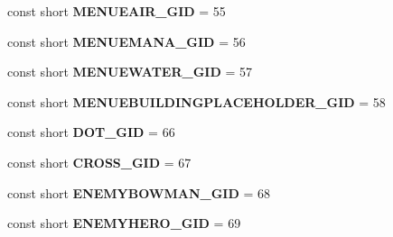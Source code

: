 \begin{DoxyCompactItemize}
\item 
\hypertarget{classClient_1_1Common_1_1Helper_1_1ClientConstants_a0cd77ccbbcc16e071663b4411c6168de}{const short {\bfseries M\-E\-N\-U\-E\-A\-I\-R\-\_\-\-G\-I\-D} = 55}\label{classClient_1_1Common_1_1Helper_1_1ClientConstants_a0cd77ccbbcc16e071663b4411c6168de}

\item 
\hypertarget{classClient_1_1Common_1_1Helper_1_1ClientConstants_a79ff3e36284aeb5f08724162e2b13442}{const short {\bfseries M\-E\-N\-U\-E\-M\-A\-N\-A\-\_\-\-G\-I\-D} = 56}\label{classClient_1_1Common_1_1Helper_1_1ClientConstants_a79ff3e36284aeb5f08724162e2b13442}

\item 
\hypertarget{classClient_1_1Common_1_1Helper_1_1ClientConstants_a46c70b7212b9d7cb2193ba764c31ec57}{const short {\bfseries M\-E\-N\-U\-E\-W\-A\-T\-E\-R\-\_\-\-G\-I\-D} = 57}\label{classClient_1_1Common_1_1Helper_1_1ClientConstants_a46c70b7212b9d7cb2193ba764c31ec57}

\item 
\hypertarget{classClient_1_1Common_1_1Helper_1_1ClientConstants_a5430fc03465ef618a97870c4007892c7}{const short {\bfseries M\-E\-N\-U\-E\-B\-U\-I\-L\-D\-I\-N\-G\-P\-L\-A\-C\-E\-H\-O\-L\-D\-E\-R\-\_\-\-G\-I\-D} = 58}\label{classClient_1_1Common_1_1Helper_1_1ClientConstants_a5430fc03465ef618a97870c4007892c7}

\item 
\hypertarget{classClient_1_1Common_1_1Helper_1_1ClientConstants_ae982dc717c58c0f117384b977811af00}{const short {\bfseries D\-O\-T\-\_\-\-G\-I\-D} = 66}\label{classClient_1_1Common_1_1Helper_1_1ClientConstants_ae982dc717c58c0f117384b977811af00}

\item 
\hypertarget{classClient_1_1Common_1_1Helper_1_1ClientConstants_a72ab47b96b7306757addc2758faf4f81}{const short {\bfseries C\-R\-O\-S\-S\-\_\-\-G\-I\-D} = 67}\label{classClient_1_1Common_1_1Helper_1_1ClientConstants_a72ab47b96b7306757addc2758faf4f81}

\item 
\hypertarget{classClient_1_1Common_1_1Helper_1_1ClientConstants_aeb7d5d9a24bc2c091006fed4dd0a35e2}{const short {\bfseries E\-N\-E\-M\-Y\-B\-O\-W\-M\-A\-N\-\_\-\-G\-I\-D} = 68}\label{classClient_1_1Common_1_1Helper_1_1ClientConstants_aeb7d5d9a24bc2c091006fed4dd0a35e2}

\item 
\hypertarget{classClient_1_1Common_1_1Helper_1_1ClientConstants_ac3fbaf8f9cb931e69451c95288313ea0}{const short {\bfseries E\-N\-E\-M\-Y\-H\-E\-R\-O\-\_\-\-G\-I\-D} = 69}\label{classClient_1_1Common_1_1Helper_1_1ClientConstants_ac3fbaf8f9cb931e69451c95288313ea0}


\end{DoxyCompactItemize}
